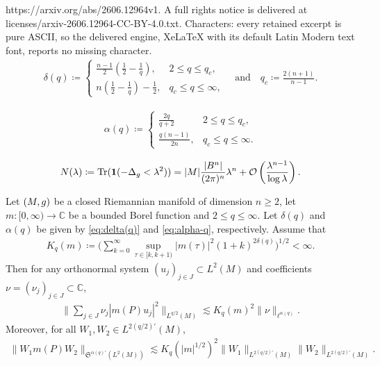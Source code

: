 \documentclass[10pt,a4paper]{amsart}
\newcommand{\C}{{\mathbb C}}
\newcommand{\coloneq}{\coloneqq}
\newcommand{\g}{{\rm g}}
\begin{document}
https://arxiv.org/abs/2606.12964v1. A full rights notice is delivered at licenses/arxiv-2606.12964-CC-BY-4.0.txt. Characters: every retained excerpt is pure ASCII, so the delivered engine, XeLaTeX with its default Latin Modern text font, reports no missing character.
\begin{align}\label{eq:delta(q)}
  \delta(q)\coloneq  \begin{cases}
    \frac{n-1}{2}(\frac{1}{2}-\frac{1}{q}), & 2\leq q\leq q_c ,\\
    n(\frac{1}{2} -\frac{1}{q})-\frac{1}{2},  & q_c\leq q \leq \infty ,
  \end{cases}
  \quad \text{and} \quad
  q_c\coloneq \frac{2(n+1)}{n-1} .
\end{align}

\begin{align}\label{eq:alpha-q}
  \alpha(q)\coloneq\begin{cases}
    \frac{2q}{q+2}& 2\leq q\leq q_c ,\\
    \frac{q(n-1)}{2n},  & q_c\leq q \leq \infty .
  \end{cases}
\end{align}

\begin{align}\label{eq:weyl-law}
  N(\lambda)\coloneq\operatorname{Tr}(\mathbf{1}({-\Delta_\g }<\lambda^2))=|M|\frac{|B^n|}{(2\pi)^n}\lambda^{n}+\mathcal{O}\left(\frac{\lambda^{n-1}}{\log\lambda}\right).
\end{align}

\begin{theorem}\label{lemma multiplier}
  Let $(M,\g)$ be a closed Riemannian manifold of dimension $n\geq 2$, let $m:[0,\infty)\to \C$ be a bounded Borel function and $2\leq q\leq\infty$. Let $\delta(q)$ and $\alpha(q)$ be given by \eqref{eq:delta(q)} and \eqref{eq:alpha-q}, respectively. Assume that
  \begin{align*}
    K_q(m)\coloneq\bigg(\sum_{k=0}^{\infty}\sup_{\tau\in [k,k+1)}|m(\tau)|^2(1+k)^{2\delta(q)}\bigg)^{1/2}<\infty .
  \end{align*}
  Then for any orthonormal system $(u_j)_{j\in J}\subset L^2(M)$ and coefficients $\nu=(\nu_j)_{j\in J}\subset\C$,
  \begin{align}\label{eq.multiplier 1}
    \bigg\|\sum_{j\in J}\nu_j |m(P)u_j|^2\bigg\|_{L^{q/2}(M)}\lesssim K_q(m)^2\|\nu\|_{\ell^{\alpha(q)}}.
  \end{align}
  Moreover, for all $W_1,W_2\in L^{2(q/2)'}(M)$,
  \begin{align}\label{eq.multiplier 2}
\|W_1m(P)W_2\|_{\mathfrak{S}^{\alpha(q)'}(L^2(M))}\lesssim K_q(|m|^{1/2})^2 \|W_1\|_{L^{2(q/2)'}(M)}\|W_2\|_{L^{2(q/2)'}(M)}.
  \end{align}
\end{theorem}
\end{document}
